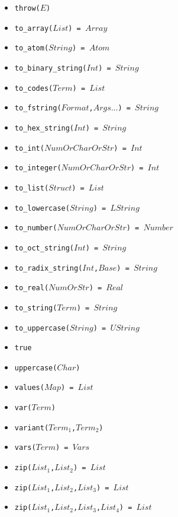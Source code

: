 \documentclass[10pt]{article}
\begin{document}
\begin{multicols}{2}
\begin{scriptsize}
\begin{itemize}
    \item \texttt{throw($E$)}    
    \item \texttt{to\_array($List$) = $Array$} 
    \item \texttt{to\_atom($String$) = $Atom$} 
    \item \texttt{to\_binary\_string($Int$) = $String$}
    \item \texttt{to\_codes($Term$) = $List$}        
    \item \texttt{to\_fstring($Format$,$Args\ldots$) = $String$}
    \item \texttt{to\_hex\_string($Int$) = $String$}    
    \item \texttt{to\_int($NumOrCharOrStr$) = $Int$} 
    \item \texttt{to\_integer($NumOrCharOrStr$) = $Int$} 
    \item \texttt{to\_list($Struct$) = $List$} 
    \item \texttt{to\_lowercase($String$) = $LString$}
    \item \texttt{to\_number($NumOrCharOrStr$) = $Number$}
    \item \texttt{to\_oct\_string($Int$) = $String$}    
    \item \texttt{to\_radix\_string($Int$,$Base$) = $String$}
    \item \texttt{to\_real($NumOrStr$) = $Real$} 
    \item \texttt{to\_string($Term$) = $String$}        
    \item \texttt{to\_uppercase($String$) = $UString$}
    \item \texttt{true}
    \item \texttt{uppercase($Char$)} 
    \item \texttt{values($Map$) = $List$} 
    \item \texttt{var($Term$)} 
    \item \texttt{variant($Term_1$,$Term_2$)}
    \item \texttt{vars($Term$) = $Vars$}
    \item \texttt{zip($List_1$,$List_2$) = $List$} 
    \item \texttt{zip($List_1$,$List_2$,$List_3$) = $List$} 
    \item \texttt{zip($List_1$,$List_2$,$List_3$,$List_4$) = $List$} 
\end{itemize}
\end{scriptsize}
%

\end{multicols}
\end{document}
